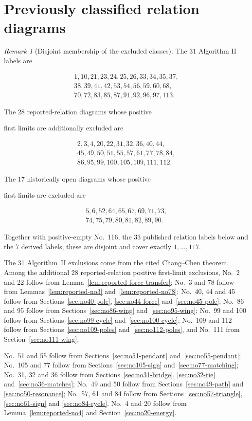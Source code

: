 \documentclass[11pt]{amsart}
\theoremstyle{remark}
\newtheorem{remark}[theorem]{Remark}
\newcommand{\Needspace}[1]{\par\ifdim\dimexpr\pagegoal-\pagetotal\relax<#1\newpage\fi}
\begin{document}
\section{Previously classified relation diagrams}\label{sec:excluded}
\begin{remark}[Disjoint membership of the excluded classes]
The 31 Algorithm II labels are

\[
\begin{gathered}
1,10,21,23,24,25,26,33,34,35,37,\\
38,39,41,42,53,54,56,59,60,68,\\
70,72,83,85,87,91,92,96,97,113.
\end{gathered}
\]

The 28 reported-relation diagrams whose positive

first limits are additionally excluded are

\[
\begin{gathered}
2,3,4,20,22,31,32,36,40,44,\\
45,49,50,51,55,57,61,77,78,84,\\
86,95,99,100,105,109,111,112.
\end{gathered}
\]

The 17 historically open diagrams whose positive

first limits are excluded are

\[
\begin{gathered}
5,6,52,64,65,67,69,71,73,\\
74,75,79,80,81,82,89,90.
\end{gathered}
\]

Together with positive-empty No.~116, the 33 published
relation labels below and the 7 derived labels, these are
disjoint and cover exactly $1,\ldots,117$.

The 31 Algorithm~II exclusions come from the cited
Chang--Chen theorem. Among the additional 28
reported-relation positive first-limit exclusions,
No.~2 and 22 follow from Lemma~\ref{lem:reported-force-transfer};
No.~3 and 78 follow from Lemmas~\ref{lem:reported-no3}
and~\ref{lem:reported-no78}; No.~40, 44 and 45 follow
from Sections~\ref{sec:no40-pole}, \ref{sec:no44-force}
and~\ref{sec:no45-pole}; No.~86 and 95 follow from
Sections~\ref{sec:no86-wing} and~\ref{sec:no95-wing};
No.~99 and 100 follow from Sections~\ref{sec:no99-cycle}
and~\ref{sec:no100-cycle}; No.~109 and 112 follow from
Sections~\ref{sec:no109-poles} and~\ref{sec:no112-poles},
and No.~111 from Section~\ref{sec:no111-wing}.

\Needspace{10\baselineskip}
No.~51 and 55 follow from Sections~\ref{sec:no51-pendant}
and~\ref{sec:no55-pendant}; No.~105 and 77 follow from
Sections~\ref{sec:no105-sign} and~\ref{sec:no77-matching};
No.~31, 32 and 36 follow from Sections~\ref{sec:no31-bridge},
\ref{sec:no32-tie} and~\ref{sec:no36-matches}; No.~49 and 50
follow from Sections~\ref{sec:no49-path} and
\ref{sec:no50-resonance}; No.~57, 61 and 84 follow from
Sections~\ref{sec:no57-triangle}, \ref{sec:no61-sign} and
\ref{sec:no84-cycle}. No.~4 and 20 follow from
Lemma~\ref{lem:reported-no4} and Section~\ref{sec:no20-energy}.


\end{remark}
\end{document}

